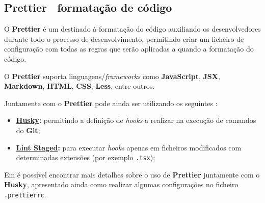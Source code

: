 \subsection{\textbf{Prettier} \textemdash~formatação de código}

\begin{minipage}{.3\textwidth}
\end{minipage}
\begin{minipage}{.7\textwidth}
	\minipagerestore
	O \textbf{Prettier} é um  destinado à formatação do código auxiliando os desenvolvedores durante todo o processo de desenvolvimento, permitindo criar um ficheiro de configuração com todas as regras que serão aplicadas a quando a formatação do código.

	O \textbf{Prettier} suporta linguagens/\textit{frameworks} como \textbf{JavaScript}, \textbf{JSX}, \textbf{Markdown}, \textbf{HTML}, \textbf{CSS}, \textbf{Less}, entre outros.
\end{minipage}

Juntamente com o \textbf{Prettier} pode ainda ser utilizando os seguintes :

\begin{itemize}
	\item \textbf{\href{https://github.com/typicode/husky}{Husky}:} permitindo a definição de \textit{hooks} a realizar na execução de comandos do \textbf{Git};
	\item \textbf{\href{https://github.com/okonet/lint-staged}{Lint Staged}:} para executar \textit{hooks} apenas em ficheiros modificados com determinadas extensões (por exemplo \verb|.tsx|);
\end{itemize}

Em  é possível encontrar mais detalhes sobre o uso de \textbf{Prettier} juntamente com o \textbf{Husky}, apresentado ainda como realizar algumas configurações no ficheiro \verb|.prettierrc|.